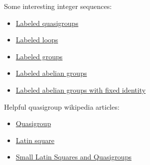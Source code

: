 Some interesting integer sequences:
\begin{itemize}
    \item \href{https://oeis.org/A002860}{Labeled quasigroups}
    \item \href{https://oeis.org/A057997}{Labeled loops}
    \item \href{https://oeis.org/A034383}{Labeled groups}
    \item \href{https://oeis.org/A034382}{Labeled abelian groups}
    \item \href{https://oeis.org/A058162}{Labeled abelian groups with fixed identity}
\end{itemize}

Helpful quasigroup wikipedia articles:
\begin{itemize}
    \item \href{https://en.wikipedia.org/wiki/Quasigroup}{Quasigroup}
    \item \href{https://en.wikipedia.org/wiki/Latin_square}{Latin square}
    \item \href{https://en.wikipedia.org/wiki/Small_Latin_squares_and_quasigroups}{Small Latin Squares and Quasigroups}
\end{itemize}

